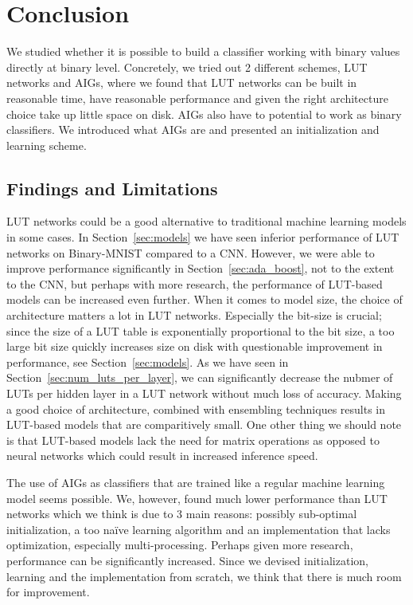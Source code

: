 \section{Conclusion}
We studied whether it is possible to build a classifier working with binary values directly at binary level. Concretely, we tried out 2 different schemes, LUT networks and AIGs, where we found that LUT networks can be built in reasonable time, have reasonable performance and given the right architecture choice take up little space on disk. AIGs also have to potential to work as binary classifiers. We introduced what AIGs are and presented an initialization and learning scheme.

\subsection{Findings and Limitations}
LUT networks could be a good alternative to traditional machine learning models in some cases. In Section~\ref{sec:models} we have seen inferior performance of LUT networks on Binary-MNIST compared to a CNN. However, we were able to improve performance significantly in Section~\ref{sec:ada_boost}, not to the extent to the CNN, but perhaps with more research, the performance of LUT-based models can be increased even further. When it comes to model size, the choice of architecture matters a lot in LUT networks. Especially the bit-size is crucial; since the size of a LUT table is exponentially proportional to the bit size, a too large bit size quickly increases size on disk with questionable improvement in performance, see Section~\ref{sec:models}. As we have seen in Section~\ref{sec:num_luts_per_layer}, we can significantly decrease the nubmer of LUTs per hidden layer in a LUT network without much loss of accuracy. Making a good choice of architecture, combined with ensembling techniques results in LUT-based models that are comparitively small. One other thing we should note is that LUT-based models lack the need for matrix operations as opposed to neural networks which could result in increased inference speed.

The use of AIGs as classifiers that are trained like a regular machine learning model seems possible. We, however, found much lower performance than LUT networks which we think is due to 3 main reasons: possibly sub-optimal initialization, a too naïve learning algorithm and an implementation that lacks optimization, especially multi-processing. Perhaps given more research, performance can be significantly increased. Since we devised initialization, learning and the implementation from scratch, we think that there is much room for improvement.

